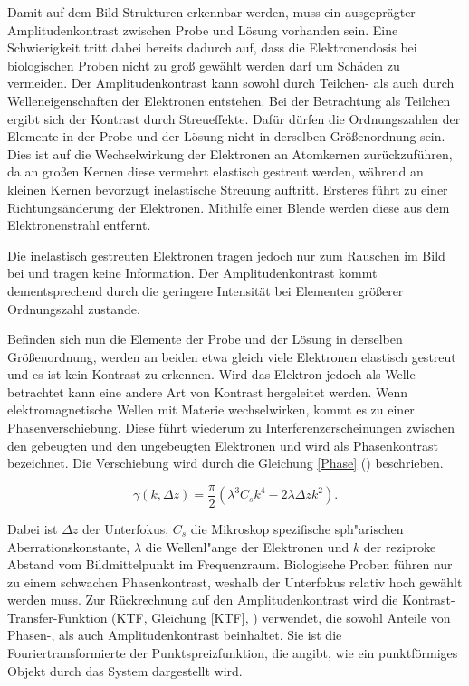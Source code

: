Damit auf dem Bild Strukturen erkennbar werden, muss ein ausgeprägter Amplitudenkontrast zwischen Probe und Lösung vorhanden sein.
Eine Schwierigkeit tritt dabei bereits dadurch auf, dass die Elektronendosis bei biologischen Proben nicht zu groß gewählt werden darf um Schäden zu vermeiden.
Der Amplitudenkontrast kann sowohl durch Teilchen- als auch durch Welleneigenschaften der Elektronen entstehen. 
Bei der Betrachtung als Teilchen ergibt sich der Kontrast durch Streueffekte.
Dafür dürfen die Ordnungszahlen der Elemente in der Probe und der Lösung nicht in derselben Größenordnung sein.
Dies ist auf die Wechselwirkung der Elektronen an Atomkernen zurückzuführen, da an großen Kernen diese vermehrt elastisch gestreut werden, während an kleinen Kernen bevorzugt inelastische Streuung auftritt.
Ersteres führt zu einer Richtungsänderung der Elektronen.
Mithilfe einer Blende werden diese aus dem Elektronenstrahl entfernt.

Die inelastisch gestreuten Elektronen tragen jedoch nur zum Rauschen im Bild bei und tragen keine Information.
Der Amplitudenkontrast kommt dementsprechend durch die geringere Intensität bei Elementen größerer Ordnungszahl zustande.

Befinden sich nun die Elemente der Probe und der Lösung in derselben Größenordnung, werden an beiden etwa gleich viele Elektronen elastisch gestreut und es ist kein Kontrast zu erkennen.
Wird das Elektron jedoch als Welle betrachtet kann eine andere Art von Kontrast hergeleitet werden.
Wenn elektromagnetische Wellen mit Materie wechselwirken, kommt es zu einer Phasenverschiebung.
Diese führt wiederum zu Interferenzerscheinungen zwischen den gebeugten und den ungebeugten Elektronen und wird als Phasenkontrast bezeichnet.
Die Verschiebung wird durch die Gleichung \eqref{Phase} (\cite{scherzer}) beschrieben.

\begin{equation}
	\gamma(k,\Delta z) = \frac{\pi}{2}\left(\lambda^3 C_s k^4 - 2\lambda \Delta z k^2\right). \label{Phase}
\end{equation}

Dabei ist $\Delta z$ der Unterfokus, $C_s$ die Mikroskop spezifische sph"arischen Aberrationskonstante, $\lambda$ die Wellenl"ange der Elektronen und $k$ der reziproke Abstand vom Bildmittelpunkt im Frequenzraum.
Biologische Proben führen nur zu einem schwachen Phasenkontrast, weshalb der Unterfokus relativ hoch gewählt werden muss.
Zur Rückrechnung auf den Amplitudenkontrast wird die Kontrast-Transfer-Funktion (KTF, Gleichung \eqref{KTF}, \cite{zhu}) verwendet, die sowohl Anteile von Phasen-, als auch Amplitudenkontrast beinhaltet.
Sie ist die Fouriertransformierte der Punktspreizfunktion, die angibt, wie ein punktförmiges Objekt durch das System dargestellt wird.

